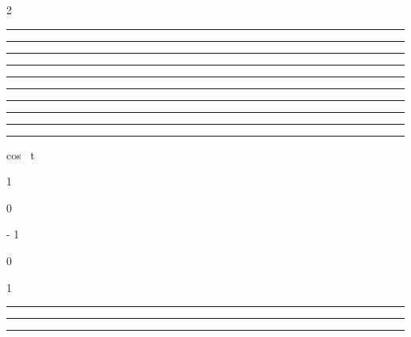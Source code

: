 \documentclass[]{article}
\begin{document}
2\pi~

\begin{center}\rule{3in}{0.4pt}\end{center}

\begin{center}\rule{3in}{0.4pt}\end{center}

\begin{center}\rule{3in}{0.4pt}\end{center}

\begin{center}\rule{3in}{0.4pt}\end{center}

\begin{center}\rule{3in}{0.4pt}\end{center}

\begin{center}\rule{3in}{0.4pt}\end{center}

\begin{center}\rule{3in}{0.4pt}\end{center}

\begin{center}\rule{3in}{0.4pt}\end{center}

\begin{center}\rule{3in}{0.4pt}\end{center}

\begin{center}\rule{3in}{0.4pt}\end{center}

 cos~ t

1

\searrow

0

\searrow

- 1

\nearrow

0

\nearrow

1

\begin{center}\rule{3in}{0.4pt}\end{center}

\begin{center}\rule{3in}{0.4pt}\end{center}

\begin{center}\rule{3in}{0.4pt}\end{center}
\end{document}
